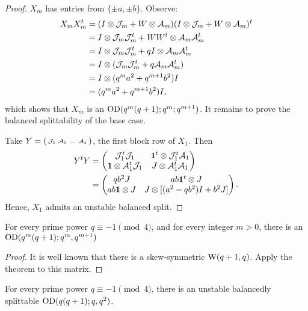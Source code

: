 \documentclass[../../../main]{subfiles}
\begin{document}
\begin{proof}
 $X_m$ has entries from $\{\pm a, \pm b\}$. Observe:
 \begin{align*}
  X_mX_m^t &= (I \otimes \mathcal{J}_m + W \otimes \mathcal{A}_m)(I \otimes \mathcal{J}_m + W \otimes \mathcal{A}_m)^t \\
  &= I \otimes \mathcal{J}_m\mathcal{J}_m^t + WW^t \otimes \mathcal{A}_m\mathcal{A}_m^t \\
  &= I \otimes \mathcal{J}_m\mathcal{J}_m^t + qI \otimes \mathcal{A}_m\mathcal{A}_m^t \\
  &= I \otimes (\mathcal{J}_m\mathcal{J}_m^t + q\mathcal{A}_m\mathcal{A}_m^t) \\
  &= I \otimes (q^ma^2 + q^{m+1}b^2)I \\
  &= (q^ma^2 + q^{m+1}b^2)I,
 \end{align*}
 which shows that $X_m$ is an $\text{OD}(q^m(q+1); q^m; q^{m+1})$. It remains to prove the balanced splittability of the base case.
 
 Take $Y=(\begin{smallmatrix} \mathcal{J}_1 & \mathcal{A}_1 & \dots & \mathcal{A}_1 \end{smallmatrix})$,
 the first block row of $X_1$. Then 
 \begin{align*}
  Y^tY &= \begin{pmatrix} \mathcal{J}_1^t\mathcal{J}_1 & \mathbf{1}^t \otimes \mathcal{J}_1^t\mathcal{A}_1 \\ \mathbf{1} \otimes \mathcal{A}_1^t\mathcal{J}_1 & J \otimes \mathcal{A}_1^t\mathcal{A}_1 \end{pmatrix} \\  
  &= \begin{pmatrix} qb^2J & ab\mathbf{1}^t \otimes J \\ ab\mathbf{1} \otimes J & J \otimes [(a^2-qb^2)I + b^2J] \end{pmatrix}. 
 \end{align*}
 Hence, $X_1$ admits an unstable balanced split.
\end{proof}

\begin{cor}
 For every prime power $q \equiv -1 \pmod{4}$, and for every integer $m>0$, there is an $\text{OD}(q^m(q+1); q^m, q^{m+1})$
\end{cor}

\begin{proof}
  It is well known \cite[see][]{combinatorics-of-symmetric-designs} that there
  is a skew-symmetric $\text{W}(q+1,q)$. Apply the theorem to this matrix. 
\end{proof}

\begin{cor}
 For every prime power $q \equiv -1 \pmod{4}$, there is an unstable balancedly
 splittable $\text{OD}(q(q+1); q, q^2)$.  
\end{cor}
\end{document}
